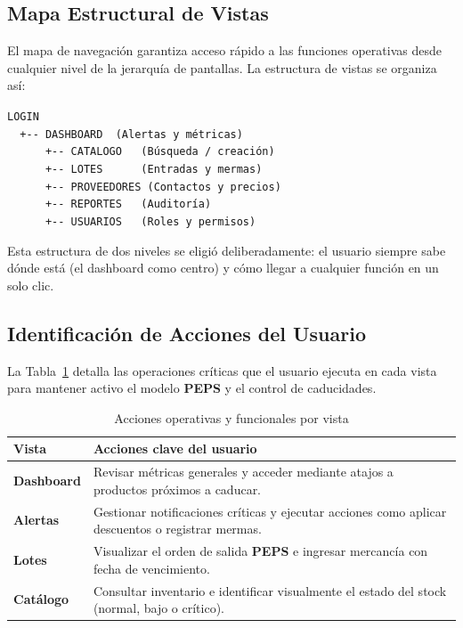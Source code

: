 \documentclass[journal]{IEEEtran}
\newcommand{\peps}{\textbf{PEPS}}
\begin{document}
	\subsection{Mapa Estructural de Vistas}
	\label{subsec:mapa}
	
	El mapa de navegaci\'{o}n garantiza acceso r\'{a}pido a las funciones
	operativas desde cualquier nivel de la jerarqu\'{i}a de pantallas.
	La estructura de vistas se organiza as\'{i}:
	
	\medskip
	\noindent\texttt{LOGIN}\\
	\noindent\texttt{\ \ +-{}- DASHBOARD\ \ (Alertas y m\'{e}tricas)}\\
	\noindent\texttt{\ \ \ \ \ \ +-{}- CATALOGO\ \ \ (B\'{u}squeda / creaci\'{o}n)}\\
	\noindent\texttt{\ \ \ \ \ \ +-{}- LOTES\ \ \ \ \ \ (Entradas y mermas)}\\
	\noindent\texttt{\ \ \ \ \ \ +-{}- PROVEEDORES\ (Contactos y precios)}\\
	\noindent\texttt{\ \ \ \ \ \ +-{}- REPORTES\ \ \ (Auditor\'{i}a)}\\
	\noindent\texttt{\ \ \ \ \ \ +-{}- USUARIOS\ \ \ (Roles y permisos)}
	\medskip
	
	Esta estructura de dos niveles se eligi\'{o} deliberadamente: el
	usuario siempre sabe d\'{o}nde est\'{a} (el dashboard como centro)
	y c\'{o}mo llegar a cualquier funci\'{o}n en un solo clic.
	
	\subsection{Identificaci\'{o}n de Acciones del Usuario}
	\label{subsec:acciones}
	
	La Tabla~\ref{tab:acciones} detalla las operaciones cr\'{i}ticas que
	el usuario ejecuta en cada vista para mantener activo el modelo
	\peps{} y el control de caducidades.
	
	\begin{table}[htbp]
		\renewcommand{\arraystretch}{1.35}
		\caption{Acciones operativas y funcionales por vista}
		\label{tab:acciones}
		\centering
		\begin{tabular}{>{\bfseries}p{1.8cm} p{5.6cm}}
			\toprule
			Vista & Acciones clave del usuario \\
			\midrule
			Dashboard
			& Revisar m\'{e}tricas generales y acceder mediante
			atajos a productos pr\'{o}ximos a caducar. \\[3pt]
			Alertas
			& Gestionar notificaciones cr\'{i}ticas y ejecutar
			acciones como aplicar descuentos o registrar
			mermas. \\[3pt]
			Lotes
			& Visualizar el orden de salida \peps{} e ingresar
			mercanc\'{i}a con fecha de vencimiento. \\[3pt]
			Cat\'{a}logo
			& Consultar inventario e identificar visualmente
			el estado del stock (normal, bajo o cr\'{i}tico). \\
			\bottomrule
		\end{tabular}
	\end{table}
	
\end{document}

